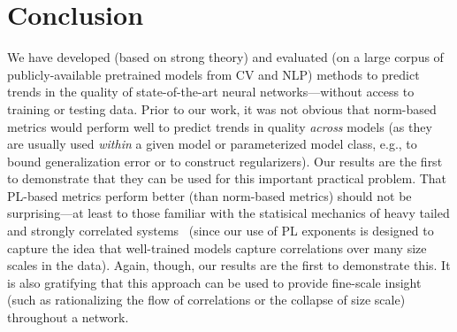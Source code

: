 \section{Conclusion}
\label{sxn:conc}

We have developed (based on strong theory) and evaluated (on a large corpus of publicly-available pretrained models from CV and NLP) methods to predict trends in the quality of state-of-the-art neural networks---without access to training or testing data.
Prior to our work, it was not obvious that norm-based metrics would perform well to predict trends in quality \emph{across} models (as they are usually used \emph{within} a given model or parameterized model class, e.g., to bound generalization error or to construct regularizers).
Our results are the first to demonstrate that they can be used for this important practical problem.
That PL-based metrics perform better (than norm-based metrics) should not be surprising---at least to those familiar with the statisical mechanics of heavy tailed and strongly correlated systems~\cite{BouchaudPotters03, SornetteBook, BP11, bun2017} (since our use of PL exponents is designed to capture the idea that well-trained models capture correlations over many size scales in the data).
Again, though, our results are the first to demonstrate this.
It is also gratifying that this approach can be used to provide fine-scale insight (such as rationalizing the flow of correlations or the collapse of size scale) throughout a network. 

